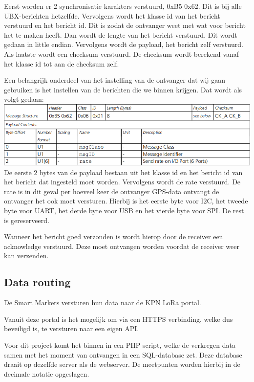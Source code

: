 Eerst worden er 2 synchronisatie karakters verstuurd, 0xB5 0x62. Dit is bij
alle UBX-berichten hetzelfde. Vervolgens wordt het klasse id van het bericht
verstuurd en het bericht id. Dit is zodat de ontvanger weet met wat voor bericht
het te maken heeft. Dan wordt de lengte van het bericht verstuurd. Dit wordt
gedaan in little endian. Vervolgens wordt de payload, het bericht zelf
verstuurd. Als laatste wordt een checksum verstuurd. De checksum wordt berekend
vanaf het klasse id tot aan de checksum zelf.

Een belangrijk onderdeel van het instelling van de ontvanger dat wij gaan
gebruiken is het instellen van de berichten die we binnen krijgen.
Dat wordt als volgt gedaan:
\includegraphics[width=\textwidth]{technical/set-rate}
\citep[p. 171]{UBlox8}\\

De eerste 2 bytes van de payload bestaan uit het klasse id en het bericht id van
het bericht dat ingesteld moet worden. Vervolgens wordt de rate verstuurd. De
rate is in dit geval per hoeveel keer de ontvanger GPS-data ontvangt de
ontvanger het ook moet versturen.
Hierbij is het eerste byte voor I2C, het tweede byte voor UART, het derde byte
voor USB en het vierde byte voor SPI. De rest is gereserveerd.
\citep[p. 11]{UBlox8}

Wanneer het bericht goed verzonden is wordt hierop door de receiver een
acknowledge verstuurd. Deze moet ontvangen worden voordat de receiver weer
kan verzenden.

\subsection{Data routing}
De Smart Markers versturen hun data naar de KPN LoRa portal.

Vanuit deze portal is het mogelijk om via een HTTPS verbinding, welke dus beveiligd is,
te versturen naar een eigen API.

Voor dit project komt het binnen in een PHP script, welke de verkregen data samen met het
moment van ontvangen in een SQL-database zet. Deze database draait op dezelfde server als
de webserver. De meetpunten worden hierbij in de decimale notatie opgeslagen.


